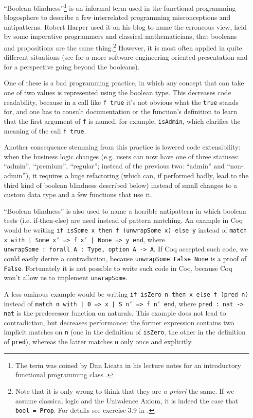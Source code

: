 \documentclass[declaration,mgr,english,shortabstract]{iithesis}
\newcommand{\m}[1]{\texttt{#1}}
\begin{document}
``Boolean blindness''\footnote{The term was coined by Dan Licata in his lecture notes for an introductory functional programming class \cite{BBLicata}.} is an informal term used in the functional programming blogosphere to describe a few interrelated programming misconceptions and antipatterns. Robert Harper used it on his blog \cite{BBHarper} to name the erroneous view, held by some imperative programmers and classical mathematicians, that booleans and propositions are the same thing.\footnote{Note that it is only wrong to think that they are \textit{a priori} the same. If we assume classical logic and the Univalence Axiom, it is indeed the case that \m{bool = Prop}. For details see exercise 3.9 in \cite{HoTTBook}.} However, it is most often applied in quite different situations (see \cite{BBFairbank} for a more software-engineering-oriented presentation and \cite{BBHXA} for a perspective going beyond the booleans).

One of these is a bad programming practice, in which any concept that can take one of two values is represented using the boolean type. This decreases code readability, because in a call like \m{f\ true} it's not obvious what the \m{true} stands for, and one has to consult documentation or the function's definition to learn that the first argument of \m{f} is named, for example, \m{isAdmin}, which clarifies the meaning of the call \m{f true}.

Another consequence stemming from this practice is lowered code extensibility: when the business logic changes (e.g. users can now have one of three statuses: ``admin'', ``premium'', ``regular''; instead of the previous two: ``admin'' and ``non-admin''), it requires a huge refactoring (which can, if performed badly, lead to the third kind of boolean blindness described below) instead of small changes to a custom data type and a few functions that use it.

``Boolean blindness'' is also used to name a horrible antipattern in which boolean tests (i.e. if-then-else) are used instead of pattern matching. An example in Coq would be writing \m{if isSome x then f (unwrapSome x) else y} instead of \m{match x with | Some x' => f x' | None => y end}, where \m{unwrapSome\ :\ forall\ A\ :\ Type, option A -> A}. If Coq accepted such code, we could easily derive a contradiction, because \m{unwrapSome False None} is a proof of \m{False}. Fortunately it is not possible to write such code in Coq, because Coq won't allow us to implement \m{unwrapSome}.

A less ominous example would be writing \m{if isZero n then x else f (pred n)} instead of \m{match n with | 0 => x | S n' => f n' end}, where \m{pred\ :\ nat -> nat} is the predecessor function on naturals. This example does not lead to contradiction, but decreases performance: the former expression contains two implicit matches on \m{n} (one in the definition of \m{isZero}, the other in the definition of \m{pred}), whereas the latter matches \m{n} only once and explicitly.
\end{document}
